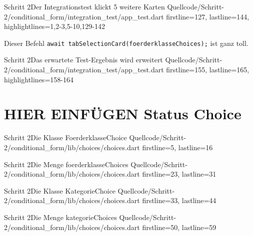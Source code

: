 

\begin{alexlistingzwei}{Schritt 2}{Der Integrationstest klickt 5 weitere Karten}
  {Quellcode/Schritt-2/conditional_form/integration_test/app_test.dart}
  {firstline=127, lastline=144, highlightlines={1,2-3,5-10,129-142}}
  \label{lst:IntegrationstestKlickt5WeitereKarten}
\end{alexlistingzwei}

Dieser Befehl \texttt{await tabSelectionCard(foerderklasseChoices);} ist ganz toll.

\begin{alexlistingzwei}{Schritt 2}{Das erwartete Test-Ergebnis wird erweitert}
  {Quellcode/Schritt-2/conditional_form/integration_test/app_test.dart}
  {firstline=155, lastline=165, highlightlines={158-164}}
  \label{lst:Schritt2ErwartetesTestErgebnisWirdErweitert}
\end{alexlistingzwei}

\section{HIER EINFÜGEN Status Choice}
\begin{alexlistingzwei}{Schritt 2}{Die Klasse FoerderklasseChoice}
  {Quellcode/Schritt-2/conditional_form/lib/choices/choices.dart}
  {firstline=5, lastline=16}
  \label{lst:Schritt2KlasseFoerderklasseChoice}
\end{alexlistingzwei}

\begin{alexlistingzwei}{Schritt 2}{Die Menge foerderklasseChoices}
  {Quellcode/Schritt-2/conditional_form/lib/choices/choices.dart}
  {firstline=23, lastline=31}
  \label{lst:Schritt2DieMengeFoerderklasseChoices}
\end{alexlistingzwei}



\begin{alexlistingzwei}{Schritt 2}{Die Klasse KategorieChoice}
  {Quellcode/Schritt-2/conditional_form/lib/choices/choices.dart}
  {firstline=33, lastline=44}
  \label{lst:Schritt2KlasseKategorieChoice}
\end{alexlistingzwei}

\begin{alexlistingzwei}{Schritt 2}{Die Menge kategorieChoices}
  {Quellcode/Schritt-2/conditional_form/lib/choices/choices.dart}
  {firstline=50, lastline=59}
  \label{lst:Schritt2MengeKategorieChoices}
\end{alexlistingzwei}

